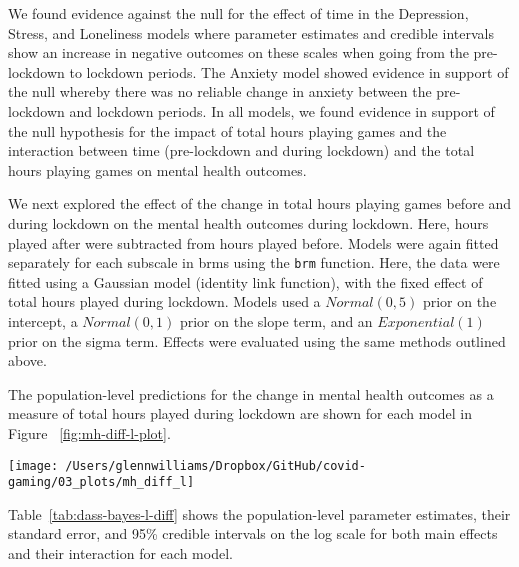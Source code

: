 \documentclass[
  english,
  jou,floatsintext]{apa6}
\begin{document}
We found evidence against the null for the effect of time in the Depression, Stress, and Loneliness models where parameter estimates and credible intervals show an increase in negative outcomes on these scales when going from the pre-lockdown to lockdown periods. The Anxiety model showed evidence in support of the null whereby there was no reliable change in anxiety between the pre-lockdown and lockdown periods. In all models, we found evidence in support of the null hypothesis for the impact of total hours playing games and the interaction between time (pre-lockdown and during lockdown) and the total hours playing games on mental health outcomes.

We next explored the effect of the change in total hours playing games before and during lockdown on the mental health outcomes during lockdown. Here, hours played after were subtracted from hours played before. Models were again fitted separately for each subscale in brms using the \texttt{brm} function. Here, the data were fitted using a Gaussian model (identity link function), with the fixed effect of total hours played during lockdown. Models used a \(Normal(0, 5)\) prior on the intercept, a \(Normal(0, 1)\) prior on the slope term, and an \(Exponential(1)\) prior on the sigma term. Effects were evaluated using the same methods outlined above.

The population-level predictions for the change in mental health outcomes as a measure of total hours played during lockdown are shown for each model in Figure ~\ref{fig:mh-diff-l-plot}.

\begin{figure*}[!htbp]

{\centering \texttt{[image: /Users/glennwilliams/Dropbox/GitHub/covid-gaming/03\_plots/mh\_diff\_l]} 

}

\caption{Change in mental health outcomes for the depression, anxiety, stress, and loneliness measures as a function of the total hours played during lockdown. Lines indicate the posterior median ± 50\%, 80\%, and 95\% credible intervals.}\label{fig:mh-diff-l-plot}
\end{figure*}

Table~\ref{tab:dass-bayes-l-diff} shows the population-level parameter estimates, their standard error, and 95\% credible intervals on the log scale for both main effects and their interaction for each model.
\end{document}
